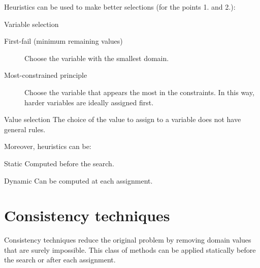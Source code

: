 Heuristics can be used to make better selections (for the points 1. and 2.):
\begin{descriptionlist}
    \item[Variable selection] 
        \phantom{}
        \begin{description}
            \item[First-fail (minimum remaining values)] 
                Choose the variable with the smallest domain.

            \item[Most-constrained principle] 
                Choose the variable that appears the most in the constraints. 
                In this way, harder variables are ideally assigned first.
        \end{description}

    \item[Value selection] 
        The choice of the value to assign to a variable does not have general rules.
\end{descriptionlist}

Moreover, heuristics can be:
\begin{descriptionlist}
    \item[Static]  
        Computed before the search. 
    
    \item[Dynamic]  
        Can be computed at each assignment.
\end{descriptionlist}



\section{Consistency techniques}

Consistency techniques reduce the original problem by removing domain values that are surely impossible.
This class of methods can be applied statically before the search or after each assignment.

